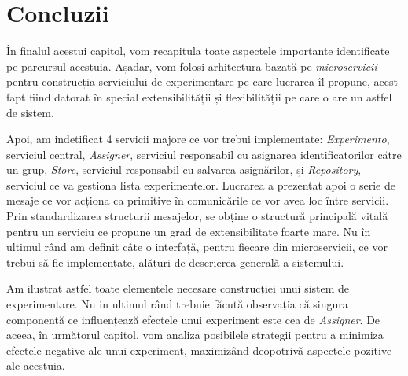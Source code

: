 \section{Concluzii}

În finalul acestui capitol, vom recapitula toate aspectele importante identificate pe parcursul acestuia. Așadar, vom folosi arhitectura bazată pe \textit{microservicii} pentru construcția serviciului de experimentare pe care lucrarea îl propune, acest fapt fiind datorat în special extensibilității și flexibilității pe care o are un astfel de sistem.

Apoi, am indetificat 4 servicii majore ce vor trebui implementate: \textit{Experimento}, serviciul central, \textit{Assigner}, serviciul responsabil cu asignarea identificatorilor către un grup, \textit{Store}, serviciul responsabil cu salvarea asignărilor, și \textit{Repository}, serviciul ce va gestiona lista experimentelor. Lucrarea a prezentat apoi o serie de mesaje ce vor acționa ca primitive în comunicările ce vor avea loc între servicii. Prin standardizarea structurii mesajelor, se obține o structură principală vitală pentru un serviciu ce propune un grad de extensibilitate foarte mare. Nu în ultimul rând am definit câte o interfață, pentru fiecare din microservicii, ce vor trebui să fie implementate, alături de descrierea generală a sistemului. 

Am ilustrat astfel toate elementele necesare construcției unui sistem de experimentare. Nu in ultimul rând trebuie făcută observația că singura componentă ce influențează efectele unui experiment este cea de \textit{Assigner}. De aceea, în următorul capitol, vom analiza posibilele strategii pentru a minimiza efectele negative ale unui experiment, maximizând deopotrivă aspectele pozitive ale acestuia.